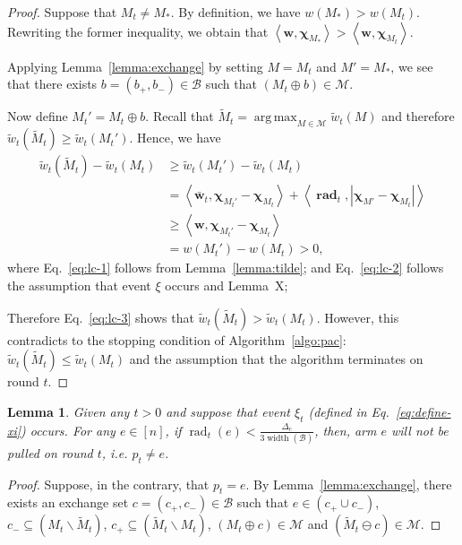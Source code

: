 \documentclass{article}
\newtheorem{lemma}{Lemma}
\newcommand{\M}{\mathcal M}
\newcommand{\B}{\mathcal B}
\newcommand{\del}{\backslash}
\DeclareMathOperator{\rank}{width}
\DeclareMathOperator{\rad}{rad}
\DeclareMathOperator*{\argmax}{arg\,max}
\newcommand{\inn}[1]{\left\langle #1 \right\rangle}
\renewcommand{\vec}[1]{\boldsymbol{#1}}
\begin{document}
\begin{spacing}{1.1}
\begin{proof}
Suppose that $M_t \not= M_*$. 
By definition, we have $w(M_*)>w(M_t)$. 
Rewriting the former inequality, we obtain that $\inn{\vec w, \vec\chi_{M_*}} > \inn{\vec w,\vec\chi_{M_t}}$.

Applying Lemma~\ref{lemma:exchange} by setting $M=M_t$ and $M'=M_*$, we see that 
there exists $b=(b_+,b_-)\in \B$ such that $(M_t \oplus b) \in \M$.


Now define $M_t' = M_t \oplus b$.
Recall that $\tilde M_t =\argmax_{M\in \M} \tilde w_t(M)$ and therefore $\tilde w_t(\tilde M_t) \ge \tilde w_t(M_t')$.
Hence, we have
\begin{align}
  \tilde w_t(\tilde M_t)-\tilde w_t(M_t) 
  &\ge \tilde w_t(M_t')-\tilde w_t(M_t) \nonumber \\
  &= \inn{\vec {\bar w}_t, \vec \chi_{M_t'}-\vec\chi_{M_t}}+\inn{\vec \rad_t, |\vec \chi_{M'}-\vec\chi_{M_t}|} \label{eq:lc-1}\\
  &\ge \inn{\vec w, \vec \chi_{M_t'}-\vec\chi_{M_t}} \label{eq:lc-2}\\
  &= w(M_t')-w(M_t) > 0 \label{eq:lc-3},
\end{align}
where Eq.~\eqref{eq:lc-1} follows from Lemma~\ref{lemma:tilde};
and Eq.~\eqref{eq:lc-2} follows the assumption that event $\xi$ occurs and Lemma~X;

Therefore Eq.~\eqref{eq:lc-3} shows that $\tilde w_t(\tilde M_t) > \tilde w_t(M_t)$. 
However, this contradicts to the stopping condition of Algorithm~\ref{algo:pac}: $\tilde w_t(\tilde M_t) \le \tilde w_t(M_t)$ and the assumption that the algorithm terminates on round $t$.
\end{proof}




\begin{lemma}
\label{lemma:key-technical}
Given any $t>0$ and suppose that event $\xi_t$ (defined in Eq.~\eqref{eq:define-xi})  occurs.
For any $e\in [n]$, if $\rad_t(e) < \frac{\Delta_e}{3\rank(\B)}$, then, arm $e$ will not be pulled on round $t$, i.e. $p_t\not= e$.
\end{lemma}

\begin{proof}
Suppose, in the contrary, that $p_t = e$.
By Lemma~\ref{lemma:exchange}, there exists an exchange set $c=(c_+,c_-) \in \B$
such that $e\in (c_+\cup c_-)$, $c_- \subseteq (M_t \del \tilde M_t)$, $c_+ \subseteq (\tilde M_t \del M_t)$, $(M_t\oplus c) \in \M$ and $(\tilde M_t \ominus c) \in \M$.


\end{proof}
\end{spacing}
\end{document}
